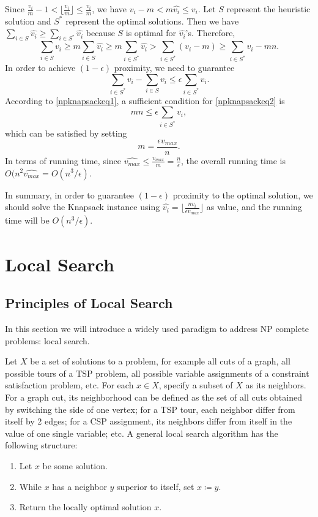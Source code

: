 Since $\frac{v_i}{m}-1<\lfloor\frac{v_i}{m}\rfloor\leq \frac{v_i}{m}$, we have $v_i-m<m\hat{v_i}\leq v_i$. Let $S$ represent the heuristic solution and $S^*$ represent the optimal solutions. Then we have $\sum_{i\in S}\hat{v_i}\geq \sum_{i\in S^*}\hat{v_i}$ because $S$ is optimal for $\hat{v_i}$'s. Therefore,
\begin{equation}\label{npknapsackeq1}
\sum_{i\in S}v_i\geq m\sum_{i\in S}\hat{v_i}\geq m\sum_{i\in S^*}\hat{v_i}> \sum_{i\in S^*}(v_i-m)\geq \sum_{i\in S^*}v_i-mn.
\end{equation}
In order to achieve $(1-\epsilon)$ proximity, we need to guarantee 
\begin{equation}\label{npknapsackeq2}
\sum_{i\in S^*}v_i-\sum_{i\in S}v_i\leq\epsilon\sum_{i\in S^*}v_i.
\end{equation}
According to \eqref{npknapsackeq1}, a sufficient condition for \eqref{npknapsackeq2} is  
\begin{equation*}
mn\leq \epsilon\sum_{i\in S^*}v_i,
\end{equation*}
which can be satisfied by setting
\begin{equation*}
m=\frac{\epsilon v_{max}}{n}.
\end{equation*}
In terms of running time, since $\hat{v_{max}}\leq\frac{v_{max}}{m}=\frac{n}{\epsilon}$, the overall running time is $O(n^2\hat{v_{max}}=O(n^3/\epsilon)$.

In summary, in order to guarantee $(1-\epsilon)$ proximity to the optimal solution, we should solve the Knapsack instance using $\hat{v_i}=\lfloor\frac{nv_i}{\epsilon v_{max}}\rfloor$ as value, and the running time will be $O(n^3/\epsilon)$.
\section{Local Search}
\subsection{Principles of Local Search}
In this section we will introduce a widely used paradigm to address NP complete problems: local search. 

Let $X$ be a set of solutions to a problem, for example all cuts of a graph, all possible tours of a TSP problem, all possible variable assignments of a constraint satisfaction problem, etc. For each $x\in X$, specify a subset of $X$ as its neighbors. For a graph cut, its neighborhood can be defined as the set of all cuts obtained by switching the side of one vertex; for a TSP tour, each neighbor differ from itself by 2 edges; for a CSP assignment, its neighbors differ from itself in the value of one single variable; etc. A general local search algorithm has the following structure:
\begin{enumerate}
\item Let $x$ be some solution.
\item While $x$ has a neighbor $y$ superior to itself, set $x\coloneqq y$.
\item Return the locally optimal solution $x$.
\end{enumerate}

